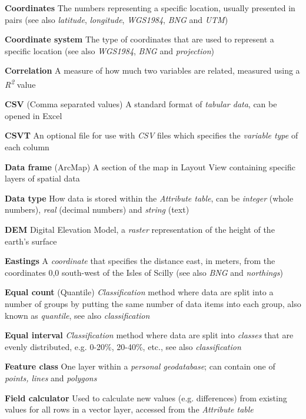 \documentclass[a4paper,10pt]{article}
\begin{document}
\begin{multicols}{2}
\textbf{Coordinates} The numbers representing a specific location, usually presented in pairs (see also \textit{latitude}, \textit{longitude}, \textit{WGS1984}, \textit{BNG} and \textit{UTM})

\textbf{Coordinate system} The type of coordinates that are used to represent a specific location (see also \textit{WGS1984}, \textit{BNG} and \textit{projection})

\textbf{Correlation} A measure of how much two variables are related, measured using a \textit{R\textsuperscript{2}} value 

\textbf{CSV} (Comma separated values) A standard format of \textit{tabular data}, can be opened in Excel  

\textbf{CSVT} An optional file for use with \textit{CSV} files which specifies the \textit{variable type} of each column %

\textbf{Data frame} (ArcMap) A section of the map in Layout View containing specific layers of spatial data

\textbf{Data type} How data is stored within the \textit{Attribute table}, can be \textit{integer} (whole numbers), \textit{real} (decimal numbers) and \textit{string} (text) 

\textbf{DEM} Digital Elevation Model, a \textit{raster} representation of the height of the earth's surface

\textbf{Eastings} A \textit{coordinate} that specifies the distance east, in meters, from the coordinates 0,0 south-west of the Isles of Scilly (see also \textit{BNG} and \textit{northings})

\textbf{Equal count} (Quantile) \textit{Classification} method where data are split into a number of groups by putting the same number of data items into each group, also known as \textit{quantile}, see also \textit{classification}

\textbf{Equal interval} \textit{Classification} method where data are split into \textit{classes} that are evenly distributed, e.g. 0-20\%, 20-40\%, etc., see also \textit{classification} 

\textbf{Feature class} One layer within a \textit{personal geodatabase}; can contain one of \textit{points, lines} and \textit{polygons}

\textbf{Field calculator} Used to calculate new values (e.g. differences) from existing values for all rows in a vector layer, accessed from the \textit{Attribute table} 



\end{multicols}
\end{document}

